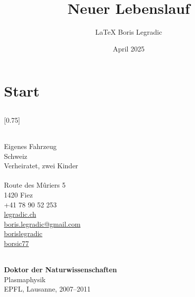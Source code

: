 \documentclass[verylight]{simplehipstercv}
\title{Neuer Lebenslauf}
\author{\LaTeX{} Boris Legradic}
\date{April 2025}
\begin{document}
\thispagestyle{empty}

\section*{Start}

\subsection*{}
\vspace{4em}

\setlength{\columnsep}{1.5cm}
[0.75]
\begin{paracol}{2}
\paracolbackgroundoptions

\footnotesize
{\setasidefontcolour
\flushright

\bigskip \bigskip
\begin{center}
\end{center}
\bigskip \bigskip

\\[0.5em]
Eigenes Fahrzeug\\
Schweiz\\
Verheiratet, zwei Kinder\\

\bigskip \bigskip
{}\\[0.5em]
Route des Mûriers 5\\
1420 Fiez\\
+41 78 90 52 253\\

\bigskip
\href{https://legradic.ch}{legradic.ch }\\
\href{mailto:boris.legradic@gmail.com}{boris.legradic@gmail.com }\\
\href{https://www.linkedin.com/in/borislegradic}{borislegradic }\\
\href{https://github.com/borsic77}{borsic77 }

\bigskip \bigskip
{}\\[0.5em]

\textbf{Doktor der Naturwissenschaften}\\
Plasmaphysik\\
EPFL, Lausanne, 2007–2011\\[0.5em]

}
\end{paracol}
\end{document}
